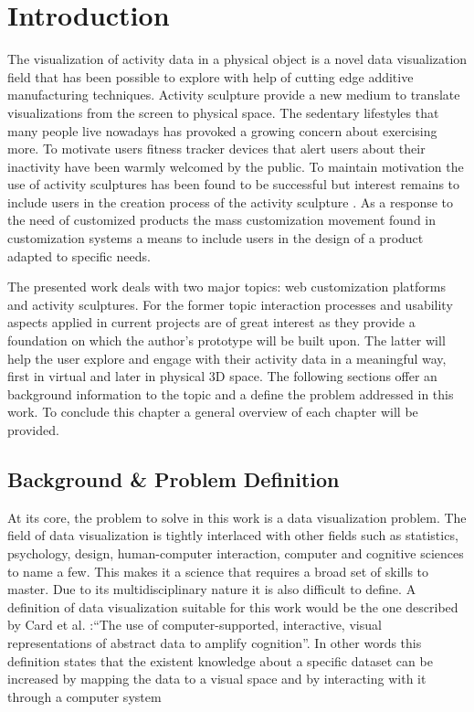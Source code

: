 \documentclass[../medieninformatik-arbeit.tex]{subfiles}
\begin{document}
\section{Introduction}
\label{ch:intro}
The visualization of activity data in a physical object is a novel data visualization field that has been possible to explore with help of cutting edge additive manufacturing techniques. Activity sculpture provide a new medium to translate visualizations from the screen to physical space. The sedentary lifestyles that many people live nowadays has provoked a growing concern about exercising more. To motivate users fitness tracker devices that alert users about their inactivity have been warmly welcomed by the public. To maintain motivation the use of activity sculptures has been found to be successful but interest remains to include users in the creation process of the activity sculpture \cite{stusak2014activity}. As a response to the need of customized products the mass customization movement found in customization systems a means to include users in the design of a product adapted to specific needs. 

The presented work deals with two major topics: web customization platforms and
activity sculptures. For the former topic interaction processes and usability aspects
applied in current projects are of great interest as they provide a foundation on
which the author's prototype will be built upon. The latter will help the user
explore and engage with their activity data in a meaningful way, first in virtual and later in physical 3D space. The following sections offer an background information to the topic
and a define the problem addressed in this work. To conclude this chapter a general
overview of each chapter will be provided.

\subsection{Background \& Problem Definition}
At its core, the problem to solve in this work is a data visualization problem.
The field of data visualization is tightly interlaced with other fields such as
statistics, psychology, design, human-computer interaction, computer and cognitive
sciences to name a few. This makes it a science that requires a broad set of
skills to master. Due to its multidisciplinary nature it is also difficult to
define. A definition of data visualization suitable for this work would be the
one described by Card et al. \cite{Card:1999:RIV:300679}:``The use of
computer-supported, interactive, visual representations of abstract data to
amplify cognition''. In other words this definition states that the existent knowledge about a specific dataset can be increased by mapping the data to a visual space and
by interacting with it through a computer system 
\end{document}
